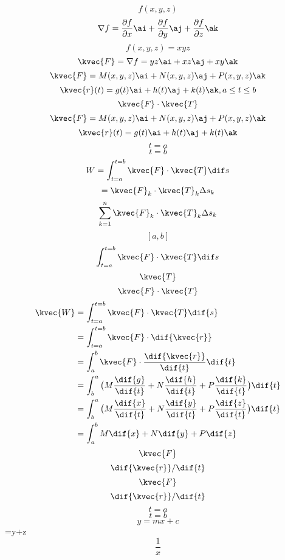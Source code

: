 \[f(x,y,z)\]
\[\nabla f=\frac{\partial{f}}{\partial{x}}\ai+\frac{\partial{f}}{\partial{y}}\aj+\frac{\partial{f}}{\partial{z}}\ak\]
\[f(x,y,z)=xyz\]
\[\kvec{F}=\nabla f=yz\ai+xz\aj+xy\ak\]
\[\kvec{F}=M(x,y,z)\ai+N(x,y,z)\aj+P(x,y,z)\ak\]
\[\kvec{r}(t)=g(t)\ai+h(t)\aj+k(t)\ak, a\le t \le b\]
\[\kvec{F}\cdot\kvec{T}\]
\[\kvec{F}=M(x,y,z)\ai+N(x,y,z)\aj+P(x,y,z)\ak\]
\[\kvec{r}(t)=g(t)\ai+h(t)\aj+k(t)\ak\]
\[t=a\]
\[t=b\]
\[W=\int_{t=a}^{t=b}\kvec{F}\cdot\kvec{T}\dif s\]
\[=\kvec{F}_{k}\cdot\kvec{T}_{k}\Delta s_{k}\]
\[\sum_{k=1}^{n}\kvec{F}_{k}\cdot\kvec{T}_{k}\Delta s_{k}\]
\[[a,b]\]
\[\int_{t=a}^{t=b}\kvec{F}\cdot \kvec{T}\dif s\]
\[\kvec{T}\]
\[\kvec{F}\cdot\kvec{T}\]
\begin{align*}
\kvec{W}&=\int_{t=a}^{t=b}\kvec{F}\cdot\kvec{T}\dif{s}\\
&=\int_{t=a}^{t=b}\kvec{F}\cdot\dif{\kvec{r}}\\
&=\int_{a}^{b}\kvec{F}\cdot \frac{\dif{\kvec{r}}}{\dif{t}}\dif{t}\\
&=\int_{b}^{a}\big(M\frac{\dif{g}}{\dif{t}}+N\frac{\dif{h}}{\dif{t}}+P\frac{\dif{k}}{\dif{t}}\big)\dif{t}\\
&=\int_{b}^{a}\big(M\frac{\dif{x}}{\dif{t}}+N\frac{\dif{y}}{\dif{t}}+P\frac{\dif{z}}{\dif{t}}\big)\dif{t}\\
&=\int_{a}^{b}M\dif{x}+N\dif{y}+P\dif{z}\\
\end{align*}
\[\kvec{F}\]
\[\dif{\kvec{r}}/\dif{t}\]
\[\kvec{F}\]
\[\dif{\kvec{r}}/\dif{t}\]
\[t=a\]
\[t=b\]
\[y=mx+c\]
\x=y+z
\[\frac{1}{x}\]




